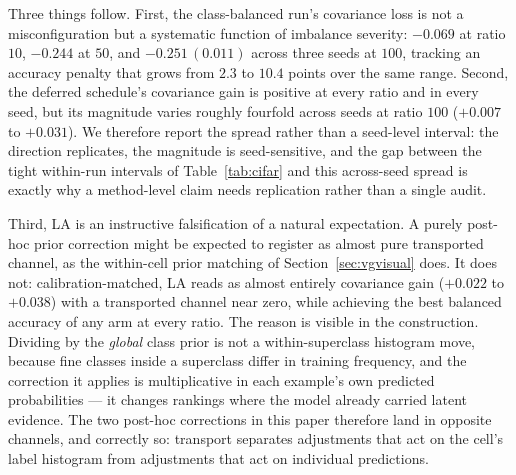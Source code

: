 Three things follow. First, the class-balanced run's covariance loss is not a
misconfiguration but a systematic function of imbalance severity: $-0.069$ at ratio $10$,
$-0.244$ at $50$, and $-0.251\,(0.011)$ across three seeds at $100$, tracking an accuracy
penalty that grows from $2.3$ to $10.4$ points over the same range. Second, the deferred
schedule's covariance gain is positive at every ratio and in every seed, but its magnitude
varies roughly fourfold across seeds at ratio $100$ ($+0.007$ to $+0.031$). We therefore
report the spread rather than a seed-level interval: the direction replicates, the
magnitude is seed-sensitive, and the gap between the tight within-run intervals of
Table~\ref{tab:cifar} and this across-seed spread is exactly why a method-level claim
needs replication rather than a single audit.

Third, LA is an instructive falsification of a natural expectation. A purely post-hoc
prior correction might be expected to register as almost pure transported channel, as the
within-cell prior matching of Section~\ref{sec:vgvisual} does. It does not:
calibration-matched, LA reads as almost entirely covariance gain ($+0.022$ to $+0.038$) with a
transported channel near zero, while achieving the best balanced accuracy of any arm at every
ratio. The reason is visible in the construction. Dividing by the \emph{global} class
prior is not a within-superclass histogram move, because fine classes inside a superclass
differ in training frequency, and the correction it applies is multiplicative in each
example's own predicted probabilities --- it changes rankings where the model already
carried latent evidence. The two post-hoc corrections in this paper therefore land in
opposite channels, and correctly so: transport separates adjustments that act on the
cell's label histogram from adjustments that act on individual predictions.

